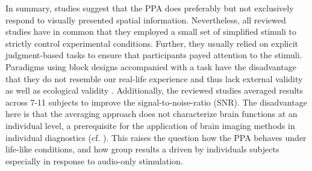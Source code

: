 \documentclass[english]{article}
\begin{document}
In summary, studies suggest that the PPA does preferably but not exclusively
respond to visually presented spatial information.
Nevertheless, all reviewed studies have in common that they employed a small set
of simplified stimuli to strictly control experimental conditions.
Further, they usually relied on explicit judgment-based tasks to ensure that
participants payed attention to the stimuli.
Paradigms using block designs accompanied with a task have the disadvantage that
they do not resemble our real-life experience and thus lack external validity
\citep{westfall2016fixing} as well as ecological validity
\citep{hasson2004intersubject}.
Additionally, the reviewed studies averaged results across 7-11 subjects to
improve the signal-to-noise-ratio (SNR).
The disadvantage here is that the averaging approach does not characterize brain
functions at an individual level, a prerequisite for the application of brain
imaging methods in individual diagnostics (cf. \cite{dubois2016building,
eickhoff2020towards}).
This raises the question how the PPA behaves under life-like conditions, and how
group results a driven by individuals subjects especially in response to
audio-only stimulation.
\end{document}
